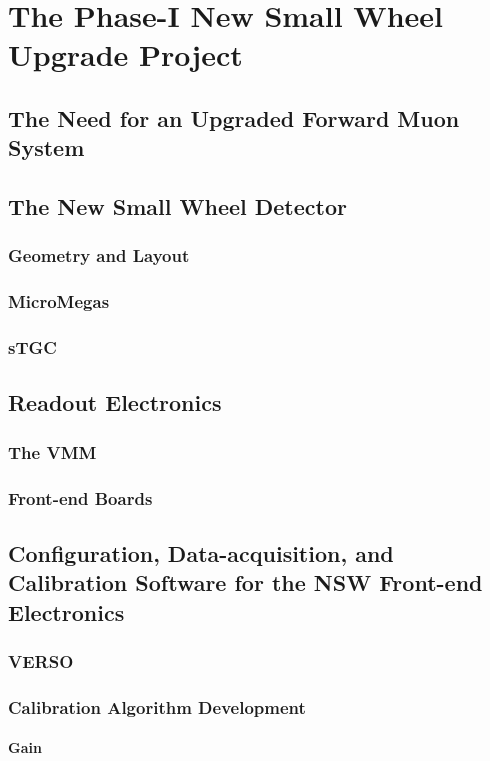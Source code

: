 \chapter{The Phase-I New Small Wheel Upgrade Project}
\label{chap:nsw}

\section{The Need for an Upgraded Forward Muon System}

\section{The New Small Wheel Detector}
\subsection{Geometry and Layout}
\subsection{MicroMegas}
\subsection{sTGC}
\section{Readout Electronics}
\subsection{The VMM}
\subsection{Front-end Boards}

\section{Configuration, Data-acquisition, and Calibration Software for the NSW Front-end Electronics}
\subsection{VERSO}
\subsection{Calibration Algorithm Development}
\subsubsection{Gain}

